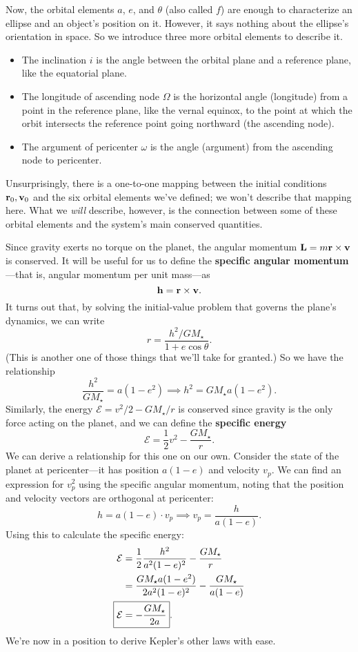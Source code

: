 \documentclass[../a062main.tex]{subfiles}
\begin{document}
Now, the orbital elements $a$, $e$, and $\theta$ (also called $f$) are enough to characterize an ellipse and an object's position on it.
However, it says nothing about the ellipse's orientation in space.
So we introduce three more orbital elements to describe it.
\begin{itemize}
    \item The inclination $i$ is the angle between the orbital plane and a reference plane, like the equatorial plane.
    \item The longitude of ascending node $\Omega$ is the horizontal angle (longitude) from a point in the reference plane, like the vernal equinox, to the point at which the orbit intersects the reference point going northward (the ascending node).
    \item The argument of pericenter $\omega$ is the angle (argument) from the ascending node to pericenter.
\end{itemize}
Unsurprisingly, there is a one-to-one mapping between the initial conditions $\mathbf{r}_0, \mathbf{v}_0$ and the six orbital elements we've defined; we won't describe that mapping here.
What we \textit{will} describe, however, is the connection between some of these orbital elements and the system's main conserved quantities.

Since gravity exerts no torque on the planet, the angular momentum $\mathbf{L} = m \mathbf{r} \times \mathbf{v}$ is conserved.
It will be useful for us to define the \textbf{specific angular momentum}---that is, angular momentum per unit mass---as
\[ \mathbf{h} = \mathbf{r} \times \mathbf{v}. \]
It turns out that, by solving the initial-value problem that governs the plane's dynamics, we can write
\[ r = \frac{h^2/GM_\star}{1 + e \cos \theta}. \]
(This is another one of those things that we'll take for granted.)
So we have the relationship
\[ \frac{h^2}{GM_\star} = a (1 - e^2) \implies \boxed{h^2 = GM_\star a (1 - e^2)}. \]
Similarly, the energy $\mathcal{E} = v^2 / 2 - GM_\star / r$ is conserved since gravity is the only force acting on the planet, and we can define the \textbf{specific energy}
\[ \mathcal{E} = \frac{1}{2}v^2 - \frac{GM_\star}{r}. \]
We can derive a relationship for this one on our own.
Consider the state of the planet at pericenter---it has position $a(1 - e)$ and velocity $v_p$.
We can find an expression for $v_p^2$ using the specific angular momentum, noting that the position and velocity vectors are orthogonal at pericenter:
\[ h = a (1 - e) \cdot v_p \implies v_p = \frac{h}{a (1 - e)}. \]
Using this to calculate the specific energy:
\begin{align*}
    \mathcal{E} &= \frac{1}{2} \frac{h^2}{a^2 (1-e)^2} - \frac{GM_\star}{r} \\
    &= \frac{GM_\star a (1 - e^2)}{2a^2 (1-e)^2} - \frac{GM_\star}{a (1-e)} \\
    \Aboxed{\mathcal{E} &= -\frac{GM_\star}{2a}}.
\end{align*}
We're now in a position to derive Kepler's other laws with ease.
\end{document}
